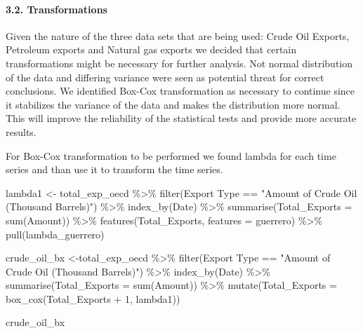 \documentclass[
]{article}
\newenvironment{Shaded}{\begin{snugshade}}{\end{snugshade}}
\newcommand{\AttributeTok}[1]{\textcolor[rgb]{0.77,0.63,0.00}{#1}}
\newcommand{\DecValTok}[1]{\textcolor[rgb]{0.00,0.00,0.81}{#1}}
\newcommand{\FunctionTok}[1]{\textcolor[rgb]{0.00,0.00,0.00}{#1}}
\newcommand{\NormalTok}[1]{#1}
\newcommand{\OtherTok}[1]{\textcolor[rgb]{0.56,0.35,0.01}{#1}}
\newcommand{\SpecialCharTok}[1]{\textcolor[rgb]{0.00,0.00,0.00}{#1}}
\newcommand{\StringTok}[1]{\textcolor[rgb]{0.31,0.60,0.02}{#1}}
\begin{document}
\hypertarget{transformations}{%
\paragraph{3.2. Transformations}\label{transformations}}

Given the nature of the three data sets that are being used: Crude Oil
Exports, Petroleum exports and Natural gas exports we decided that
certain transformations might be necessary for further analysis. Not
normal distribution of the data and differing variance were seen as
potential threat for correct conclusions. We identified Box-Cox
transformation as necessary to continue since it stabilizes the variance
of the data and makes the distribution more normal. This will improve
the reliability of the statistical tests and provide more accurate
results.

For Box-Cox transformation to be performed we found lambda for each time
series and than use it to transform the time series.

\begin{Shaded}
\begin{Highlighting}[]
\NormalTok{lambda1 }\OtherTok{\textless{}{-}}\NormalTok{ total\_exp\_oecd }\SpecialCharTok{\%\textgreater{}\%} 
  \FunctionTok{filter}\NormalTok{(}\StringTok{\textasciigrave{}}\AttributeTok{Export Type}\StringTok{\textasciigrave{}} \SpecialCharTok{==} \StringTok{"Amount of Crude Oil (Thousand Barrels)"}\NormalTok{) }\SpecialCharTok{\%\textgreater{}\%} 
  \FunctionTok{index\_by}\NormalTok{(Date) }\SpecialCharTok{\%\textgreater{}\%} 
  \FunctionTok{summarise}\NormalTok{(}\AttributeTok{Total\_Exports =} \FunctionTok{sum}\NormalTok{(Amount)) }\SpecialCharTok{\%\textgreater{}\%} 
  \FunctionTok{features}\NormalTok{(Total\_Exports, }\AttributeTok{features =}\NormalTok{ guerrero) }\SpecialCharTok{\%\textgreater{}\%} 
  \FunctionTok{pull}\NormalTok{(lambda\_guerrero)}

\NormalTok{crude\_oil\_bx }\OtherTok{\textless{}{-}}\NormalTok{total\_exp\_oecd }\SpecialCharTok{\%\textgreater{}\%} 
  \FunctionTok{filter}\NormalTok{(}\StringTok{\textasciigrave{}}\AttributeTok{Export Type}\StringTok{\textasciigrave{}} \SpecialCharTok{==} \StringTok{"Amount of Crude Oil (Thousand Barrels)"}\NormalTok{) }\SpecialCharTok{\%\textgreater{}\%} 
  \FunctionTok{index\_by}\NormalTok{(Date) }\SpecialCharTok{\%\textgreater{}\%} 
  \FunctionTok{summarise}\NormalTok{(}\AttributeTok{Total\_Exports =} \FunctionTok{sum}\NormalTok{(Amount)) }\SpecialCharTok{\%\textgreater{}\%} 
  \FunctionTok{mutate}\NormalTok{(}\AttributeTok{Total\_Exports =} \FunctionTok{box\_cox}\NormalTok{(Total\_Exports }\SpecialCharTok{+} \DecValTok{1}\NormalTok{, lambda1))}

\NormalTok{crude\_oil\_bx}
\end{Highlighting}
\end{Shaded}
\end{document}
